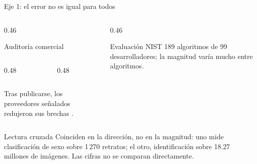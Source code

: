\begin{frame}{Eje 1: el error no es igual para todos}
  \begin{columns}[T]
    \begin{column}{0.46\textwidth}
      \begin{block}{Auditor\'ia comercial \cite{buolamwini_gendershades_2018}}
        \begin{columns}
          \begin{column}{0.48\linewidth}
          \end{column}
          \begin{column}{0.48\linewidth}
          \end{column}
        \end{columns}
        \scriptsize Tras publicarse, los proveedores se\~nalados redujeron
        sus brechas \cite{raji_actionable_2019}.
      \end{block}
    \end{column}
    \begin{column}{0.46\textwidth}
      \begin{block}{Evaluaci\'on NIST \cite{grother_nistir8280_2019}}
        \scriptsize 189 algoritmos de 99 desarrolladores; la magnitud var\'ia
        mucho entre algoritmos.
      \end{block}
    \end{column}
  \end{columns}

  \begin{alertblock}{Lectura cruzada}
    \scriptsize
    Coinciden en la direcci\'on, no en la magnitud: uno mide
    clasificaci\'on de sexo sobre 1\,270 retratos; el otro, identificaci\'on
    sobre 18.27 millones de im\'agenes. Las cifras no se comparan
    directamente.
  \end{alertblock}
\end{frame}

